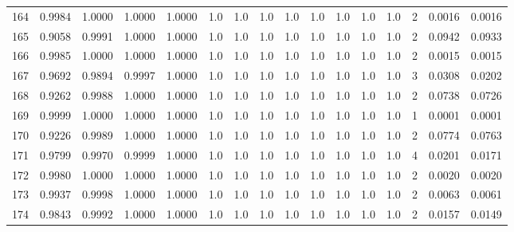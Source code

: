 \begin{tabular}{lrrrrrrrrrrrrrrr}
164 &      0.9984 &  1.0000 &  1.0000 &  1.0000 &     1.0 &     1.0 &     1.0 &     1.0 &     1.0 &     1.0 &      1.0 &        1.0 &      2 &                    0.0016 &                     0.0016 \\
165 &      0.9058 &  0.9991 &  1.0000 &  1.0000 &     1.0 &     1.0 &     1.0 &     1.0 &     1.0 &     1.0 &      1.0 &        1.0 &      2 &                    0.0942 &                     0.0933 \\
166 &      0.9985 &  1.0000 &  1.0000 &  1.0000 &     1.0 &     1.0 &     1.0 &     1.0 &     1.0 &     1.0 &      1.0 &        1.0 &      2 &                    0.0015 &                     0.0015 \\
167 &      0.9692 &  0.9894 &  0.9997 &  1.0000 &     1.0 &     1.0 &     1.0 &     1.0 &     1.0 &     1.0 &      1.0 &        1.0 &      3 &                    0.0308 &                     0.0202 \\
168 &      0.9262 &  0.9988 &  1.0000 &  1.0000 &     1.0 &     1.0 &     1.0 &     1.0 &     1.0 &     1.0 &      1.0 &        1.0 &      2 &                    0.0738 &                     0.0726 \\
169 &      0.9999 &  1.0000 &  1.0000 &  1.0000 &     1.0 &     1.0 &     1.0 &     1.0 &     1.0 &     1.0 &      1.0 &        1.0 &      1 &                    0.0001 &                     0.0001 \\
170 &      0.9226 &  0.9989 &  1.0000 &  1.0000 &     1.0 &     1.0 &     1.0 &     1.0 &     1.0 &     1.0 &      1.0 &        1.0 &      2 &                    0.0774 &                     0.0763 \\
171 &      0.9799 &  0.9970 &  0.9999 &  1.0000 &     1.0 &     1.0 &     1.0 &     1.0 &     1.0 &     1.0 &      1.0 &        1.0 &      4 &                    0.0201 &                     0.0171 \\
172 &      0.9980 &  1.0000 &  1.0000 &  1.0000 &     1.0 &     1.0 &     1.0 &     1.0 &     1.0 &     1.0 &      1.0 &        1.0 &      2 &                    0.0020 &                     0.0020 \\
173 &      0.9937 &  0.9998 &  1.0000 &  1.0000 &     1.0 &     1.0 &     1.0 &     1.0 &     1.0 &     1.0 &      1.0 &        1.0 &      2 &                    0.0063 &                     0.0061 \\
174 &      0.9843 &  0.9992 &  1.0000 &  1.0000 &     1.0 &     1.0 &     1.0 &     1.0 &     1.0 &     1.0 &      1.0 &        1.0 &      2 &                    0.0157 &                     0.0149 \\

\end{tabular}
